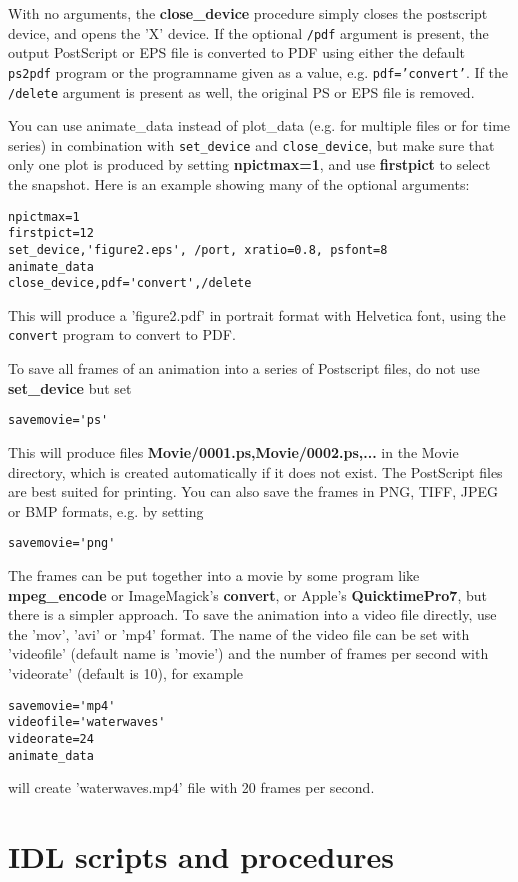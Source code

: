 \documentclass{article}
\begin{document}
With no arguments, the {\bf close\_device} procedure
simply closes the postscript device, and opens the 'X' device.
If the optional {\tt /pdf} argument is present, the output PostScript or EPS
file is converted to PDF using either the default {\tt ps2pdf} program 
or the programname given as a value, e.g. {\tt pdf='convert'}.
If the {\tt /delete} argument is present as well, the original PS or EPS file
is removed. 

You can use animate\_data instead of plot\_data (e.g. for multiple files or 
for time series) in combination with {\tt set\_device} and 
{\tt close\_device}, but make sure that only one plot is produced by setting
{\bf npictmax=1}, and use {\bf firstpict} to select the snapshot.
Here is an example showing many of the optional arguments:
\begin{verbatim}
npictmax=1
firstpict=12
set_device,'figure2.eps', /port, xratio=0.8, psfont=8
animate_data
close_device,pdf='convert',/delete
\end{verbatim}
This will produce a 'figure2.pdf' in portrait format with Helvetica font,
using the {\tt convert} program to convert to PDF.

To save all frames of an animation into a series of Postscript files, 
do not use {\bf set\_device} but set
\begin{verbatim}
savemovie='ps'
\end{verbatim}
This will produce files {\bf Movie/0001.ps,Movie/0002.ps,...} 
in the Movie directory, which is created automatically if it does
not exist. The PostScript files are best suited for printing.
You can also save the frames in PNG, TIFF, JPEG or BMP formats, e.g.
by setting 
\begin{verbatim}
savemovie='png'
\end{verbatim}
The frames can be put together into a movie by some program like
{\bf mpeg\_encode} or ImageMagick's {\bf convert}, or 
Apple's {\bf QuicktimePro7}, but there is a simpler approach.
To save the animation into a video file directly, 
use the 'mov', 'avi' or 'mp4' format. The name of the video file
can be set with 'videofile' (default name is 'movie') 
and the number of frames per second with 'videorate' (default is 10), 
for example
\begin{verbatim}
savemovie='mp4'
videofile='waterwaves'
videorate=24
animate_data
\end{verbatim}
will create 'waterwaves.mp4' file with 20 frames per second.

\section{IDL scripts and procedures \label{s-idl-script}}
\end{document}
